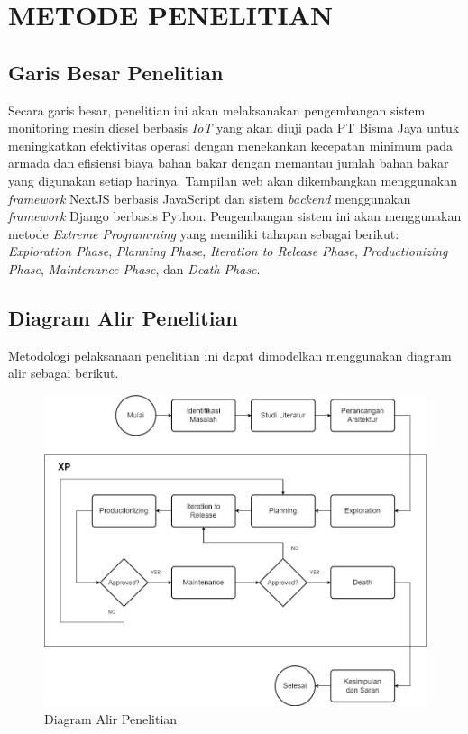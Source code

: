 \chapter{METODE PENELITIAN}

\section{Garis Besar Penelitian}

Secara garis besar, penelitian ini akan melaksanakan pengembangan sistem monitoring mesin diesel berbasis \textit{IoT} yang akan diuji pada PT Bisma Jaya untuk meningkatkan efektivitas operasi dengan menekankan kecepatan minimum pada armada dan efisiensi biaya bahan bakar dengan memantau jumlah bahan bakar yang digunakan setiap harinya. Tampilan web akan dikembangkan menggunakan \textit{framework} NextJS berbasis JavaScript dan sistem \textit{backend} menggunakan \textit{framework} Django berbasis Python. Pengembangan sistem ini akan menggunakan metode \textit{Extreme Programming} yang memiliki tahapan sebagai berikut: \textit{Exploration Phase}, \textit{Planning Phase}, \textit{Iteration to Release Phase}, \textit{Productionizing Phase}, \textit{Maintenance Phase}, dan \textit{Death Phase}.

\section{Diagram Alir Penelitian}

Metodologi pelaksanaan penelitian ini dapat dimodelkan menggunakan diagram alir sebagai berikut.

\begin{figure}[!h]
    \includegraphics[width=1.1\linewidth, center]{images/metode/flowchart-penelitian.jpg}
    \caption{Diagram Alir Penelitian}
    \label{fig:flow-research}
\end{figure}



